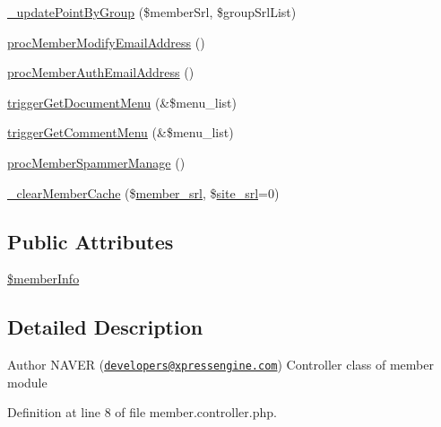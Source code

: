 \begin{DoxyCompactItemize}
\item 
\hyperlink{classmemberController_abe9b21621506198b75656781e6919dba}{\-\_\-update\-Point\-By\-Group} (\$member\-Srl, \$group\-Srl\-List)
\item 
\hyperlink{classmemberController_ac5954a875ecc954379437d5c7762fdfe}{proc\-Member\-Modify\-Email\-Address} ()
\item 
\hyperlink{classmemberController_a7584206ce0ce606173fade04207fb1ea}{proc\-Member\-Auth\-Email\-Address} ()
\item 
\hyperlink{classmemberController_a4f6ca6a2a8db362cac531920762a94f9}{trigger\-Get\-Document\-Menu} (\&\$menu\-\_\-list)
\item 
\hyperlink{classmemberController_aa97406ab4da679f7b54cceb404bd563f}{trigger\-Get\-Comment\-Menu} (\&\$menu\-\_\-list)
\item 
\hyperlink{classmemberController_a99f87aecac7ae283cec747a007df88b8}{proc\-Member\-Spammer\-Manage} ()
\item 
\hyperlink{classmemberController_a6b061f30aaaa5c4f1f8da1d52fdb2da9}{\-\_\-clear\-Member\-Cache} (\$\hyperlink{ko_8install_8php_aa61f9e08f0fe505094d26f8143f30bbd}{member\-\_\-srl}, \$\hyperlink{ko_8install_8php_a8b1406b4ad1048041558dce6bfe89004}{site\-\_\-srl}=0)
\end{DoxyCompactItemize}
\subsection*{Public Attributes}
\begin{DoxyCompactItemize}
\item 
\hyperlink{classmemberController_a01868bd628d8e1b39a4256352fccad44}{\$member\-Info}
\end{DoxyCompactItemize}


\subsection{Detailed Description}
\begin{DoxyAuthor}{Author}
N\-A\-V\-E\-R (\href{mailto:developers@xpressengine.com}{\tt developers@xpressengine.\-com}) Controller class of member module 
\end{DoxyAuthor}


Definition at line 8 of file member.\-controller.\-php.



